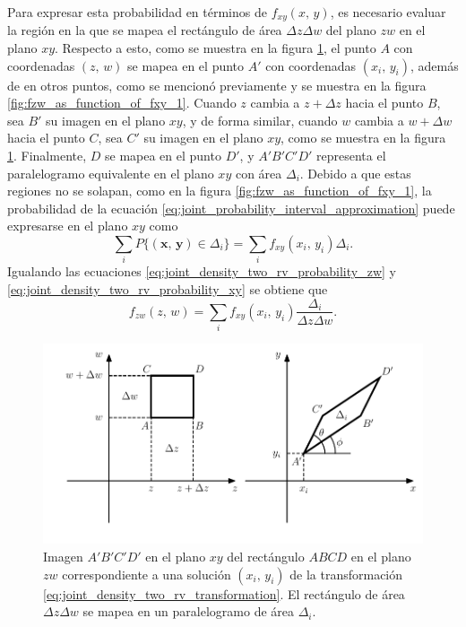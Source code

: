 \documentclass[a4paper]{report}
\newcommand{\x}{\mathbf{x}}
\newcommand{\y}{\mathbf{y}}
\begin{document}
Para expresar esta probabilidad en términos de \(f_{xy}(x,\,y)\), es necesario evaluar la región en la que se mapea el rectángulo de área \(\Delta z\Delta w\) del plano \(zw\) en el plano \(xy\). Respecto a esto, como se muestra en la figura \ref{fig:fzw_as_function_of_fxy_2}, el punto \(A\) con coordenadas \((z,\,w)\) se mapea en el punto \(A'\) con coordenadas \((x_i,\,y_i)\), además de en otros puntos, como se mencionó previamente y se muestra en la figura \ref{fig:fzw_as_function_of_fxy_1}. Cuando \(z\) cambia a \(z+\Delta z\) hacia el punto \(B\), sea \(B'\) su imagen en el plano \(xy\), y de forma similar, cuando \(w\) cambia a \(w+\Delta w\) hacia el punto \(C\), sea \(C'\) su imagen en el plano \(xy\), como se muestra en la figura \ref{fig:fzw_as_function_of_fxy_2}. Finalmente, \(D\) se mapea en el punto \(D'\), y \(A'B'C'D'\) representa el paralelogramo equivalente en el plano \(xy\) con área \(\Delta_i\). Debido a que estas regiones no se solapan, como en la figura \ref{fig:fzw_as_function_of_fxy_1}, la probabilidad de la ecuación \ref{eq:joint_probability_interval_approximation} puede expresarse en el plano \(xy\) como
\begin{equation}\label{eq:joint_density_two_rv_probability_xy}
 \sum_i P\{(\x,\,\y)\in\Delta_i\}=\sum_i f_{xy}(x_i,\,y_i)\Delta_i.
\end{equation}
Igualando las ecuaciones \ref{eq:joint_density_two_rv_probability_zw} y \ref{eq:joint_density_two_rv_probability_xy} se obtiene que 
\begin{equation}\label{eq:joint_density_two_rv_probability_relation_tmp}
 f_{zw}(z,\,w)=\sum_i f_{xy}(x_i,\,y_i)\frac{\Delta_i}{\Delta z\Delta w}.
\end{equation}
\begin{figure}[!htb]
\begin{center}
 \includegraphics[width=0.8\columnwidth]{figuras/fzw_as_function_of_fxy_2.pdf}
\caption{Imagen \(A'B'C'D'\) en el plano \(xy\) del rectángulo \(ABCD\) en el plano \(zw\) correspondiente a una solución \((x_i,\,y_i)\) de la transformación \ref{eq:joint_density_two_rv_transformation}. El rectángulo de área \(\Delta z\Delta w\) se mapea en un paralelogramo de área \(\Delta_i\).}\label{fig:fzw_as_function_of_fxy_2}
\end{center}
\end{figure}
\end{document}
